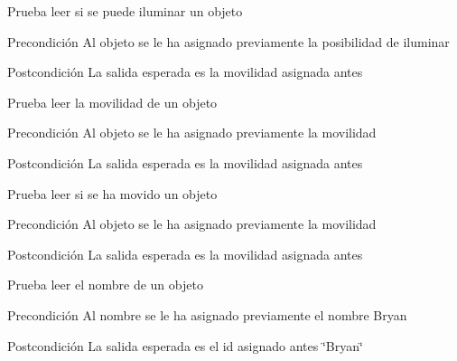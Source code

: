 \begin{DoxyRefList}
\item[\label{test__test000201}%
\hypertarget{test__test000201}{}%
Global \hyperlink{object__test_8c_acf6ecf69ab8d1e663f72e22a70a60d2f}{test1\-\_\-object\-\_\-\-Get\-\_\-\-Light} ()]Prueba leer si se puede iluminar un objeto \begin{DoxyPrecond}{Precondición}
Al objeto se le ha asignado previamente la posibilidad de iluminar 
\end{DoxyPrecond}
\begin{DoxyPostcond}{Postcondición}
La salida esperada es la movilidad asignada antes  
\end{DoxyPostcond}

\item[\label{test__test000191}%
\hypertarget{test__test000191}{}%
Global \hyperlink{object__test_8c_ac0706c45d9fd650fd8cd3d316224dcfd}{test1\-\_\-object\-\_\-\-Get\-\_\-\-Mobile} ()]Prueba leer la movilidad de un objeto \begin{DoxyPrecond}{Precondición}
Al objeto se le ha asignado previamente la movilidad 
\end{DoxyPrecond}
\begin{DoxyPostcond}{Postcondición}
La salida esperada es la movilidad asignada antes  
\end{DoxyPostcond}

\item[\label{test__test000193}%
\hypertarget{test__test000193}{}%
Global \hyperlink{object__test_8c_ad754277594692ac4d2af79bfd42b87e1}{test1\-\_\-object\-\_\-\-Get\-\_\-\-Moved} ()]Prueba leer si se ha movido un objeto \begin{DoxyPrecond}{Precondición}
Al objeto se le ha asignado previamente la movilidad 
\end{DoxyPrecond}
\begin{DoxyPostcond}{Postcondición}
La salida esperada es la movilidad asignada antes  
\end{DoxyPostcond}

\item[\label{test__test000181}%
\hypertarget{test__test000181}{}%
Global \hyperlink{object__test_8c_a689d739bb9f7da71a4b1f77f200ac91a}{test1\-\_\-object\-\_\-\-Get\-\_\-\-Name} ()]Prueba leer el nombre de un objeto \begin{DoxyPrecond}{Precondición}
Al nombre se le ha asignado previamente el nombre Bryan 
\end{DoxyPrecond}
\begin{DoxyPostcond}{Postcondición}
La salida esperada es el id asignado antes \char`\"{}\-Bryan\char`\"{}  
\end{DoxyPostcond}


\end{DoxyRefList}

